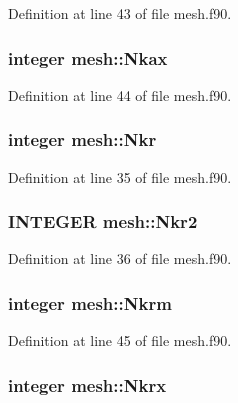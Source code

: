 Definition at line 43 of file mesh.f90.

\hypertarget{namespacemesh_a29b4b004a2f1961e2ad6ea8faf2bc447}{
\subsubsection[{Nkax}]{\setlength{\rightskip}{0pt plus 5cm}integer {\bf mesh::Nkax}}}
\label{namespacemesh_a29b4b004a2f1961e2ad6ea8faf2bc447}


Definition at line 44 of file mesh.f90.

\hypertarget{namespacemesh_a1d27552200f5f3bf302bcbd55bb2ccf5}{
\subsubsection[{Nkr}]{\setlength{\rightskip}{0pt plus 5cm}integer {\bf mesh::Nkr}}}
\label{namespacemesh_a1d27552200f5f3bf302bcbd55bb2ccf5}


Definition at line 35 of file mesh.f90.

\hypertarget{namespacemesh_a55a4e9bc46503b5f1fddde6e621a0b86}{
\subsubsection[{Nkr2}]{\setlength{\rightskip}{0pt plus 5cm}INTEGER {\bf mesh::Nkr2}}}
\label{namespacemesh_a55a4e9bc46503b5f1fddde6e621a0b86}


Definition at line 36 of file mesh.f90.

\hypertarget{namespacemesh_ac39a727e6167a944fb3c7997bfd11de4}{
\subsubsection[{Nkrm}]{\setlength{\rightskip}{0pt plus 5cm}integer {\bf mesh::Nkrm}}}
\label{namespacemesh_ac39a727e6167a944fb3c7997bfd11de4}


Definition at line 45 of file mesh.f90.

\hypertarget{namespacemesh_a1750b1e7febac49c12606a9cbf2c4ac2}{
\subsubsection[{Nkrx}]{\setlength{\rightskip}{0pt plus 5cm}integer {\bf mesh::Nkrx}}}
\label{namespacemesh_a1750b1e7febac49c12606a9cbf2c4ac2}


